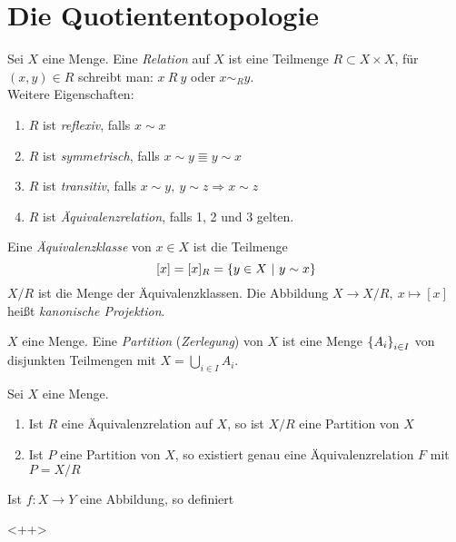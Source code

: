 \section{Die Quotiententopologie}


\begin{dfn}
    Sei $X$ eine Menge. Eine \emph{Relation} auf $X$ ist eine Teilmenge
    $R\subset X\times X$, für $(x,y)\in R$ schreibt man: $x\ R\ y$ oder $x \sim_R y$.\\
    Weitere Eigenschaften:
    \begin{enumerate}
        \item $R$ ist \emph{reflexiv}, falls $x\sim x$
        \item $R$ ist \emph{symmetrisch}, falls $x\sim y \Equiv y\sim x$
        \item $R$ ist \emph{transitiv}, falls $x\sim y,\ y\sim z \Rightarrow
            x\sim z$
        \item $R$ ist \emph{Äquivalenzrelation}, falls 1, 2 und 3 gelten.
    \end{enumerate}
\end{dfn}

\begin{dfn}
    Eine \emph{Äquivalenzklasse} von $x\in X$ ist die Teilmenge
    \[ [x] = [x]_R = \mdef[y\in X]{y \sim x} \]
    $X/R$ ist die Menge der Äquivalenzklassen. Die Abbildung $X\to X/R,\ x\mapsto[x]$
    heißt \emph{kanonische Projektion}.
\end{dfn}

\begin{dfn}
    $X$ eine Menge. Eine \emph{Partition} (\emph{Zerlegung}) von $X$ ist eine Menge 
    $\mdef{A_i}_{i\in I}$ von disjunkten Teilmengen mit $X=\bigcup_{i\in I} A_i$.
\end{dfn}

\begin{lem}
    Sei $X$ eine Menge.
    \begin{enumerate}
        \item Ist $R$ eine Äquivalenzrelation auf $X$, so ist $X/R$ eine Partition
            von $X$
        \item Ist $P$ eine Partition von $X$, so existiert genau eine
            Äquivalenzrelation $F$ mit $P=X/R$
    \end{enumerate}
\end{lem}

\begin{lem}
    Ist $f:X\to Y$ eine Abbildung, so definiert 
\end{lem}<++>
